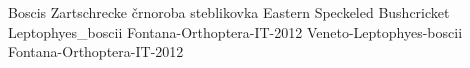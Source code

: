 {Boscis Zartschrecke} %
{\v{c}rnoroba steblikovka} %
{Eastern Speckeled Bushcricket} %
{Leptophyes_boscii} %
{Fontana-Orthoptera-IT-2012}%
{} %
{\url{}} %
{} %
{} %
{Veneto-Leptophyes-boscii} %
{Fontana-Orthoptera-IT-2012}%
